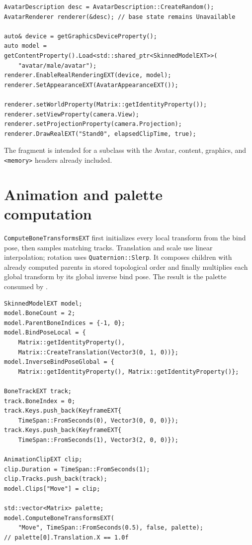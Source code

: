 \begin{lstlisting}
AvatarDescription desc = AvatarDescription::CreateRandom();
AvatarRenderer renderer(&desc); // base state remains Unavailable

auto& device = getGraphicsDeviceProperty();
auto model = getContentProperty().Load<std::shared_ptr<SkinnedModelEXT>>(
    "avatar/male/avatar");
renderer.EnableRealRenderingEXT(device, model);
renderer.SetAppearanceEXT(AvatarAppearanceEXT());

renderer.setWorldProperty(Matrix::getIdentityProperty());
renderer.setViewProperty(camera.View);
renderer.setProjectionProperty(camera.Projection);
renderer.DrawRealEXT("Stand0", elapsedClipTime, true);
\end{lstlisting}

The fragment is intended for a  subclass with the Avatar, content, graphics, and
\texttt{<memory>} headers already included.

\section{Animation and palette computation}

\texttt{ComputeBoneTransformsEXT} first initializes every local transform from the bind pose,
then samples matching tracks. Translation and scale use linear interpolation; rotation uses
\texttt{Quaternion::Slerp}. It composes children with already computed parents in stored
topological order and finally multiplies each global transform by its global inverse bind pose.
The result is the palette consumed by .

\begin{lstlisting}
SkinnedModelEXT model;
model.BoneCount = 2;
model.ParentBoneIndices = {-1, 0};
model.BindPoseLocal = {
    Matrix::getIdentityProperty(),
    Matrix::CreateTranslation(Vector3(0, 1, 0))};
model.InverseBindPoseGlobal = {
    Matrix::getIdentityProperty(), Matrix::getIdentityProperty()};

BoneTrackEXT track;
track.BoneIndex = 0;
track.Keys.push_back(KeyframeEXT{
    TimeSpan::FromSeconds(0), Vector3(0, 0, 0)});
track.Keys.push_back(KeyframeEXT{
    TimeSpan::FromSeconds(1), Vector3(2, 0, 0)});

AnimationClipEXT clip;
clip.Duration = TimeSpan::FromSeconds(1);
clip.Tracks.push_back(track);
model.Clips["Move"] = clip;

std::vector<Matrix> palette;
model.ComputeBoneTransformsEXT(
    "Move", TimeSpan::FromSeconds(0.5), false, palette);
// palette[0].Translation.X == 1.0f
\end{lstlisting}

